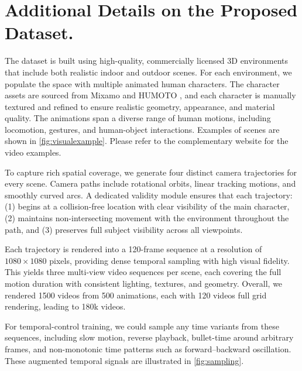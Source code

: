 \section{Additional Details on the Proposed \nameDataset Dataset.}

The \texttt{\nameDataset} dataset is built using high-quality, commercially licensed 3D environments that include both realistic indoor and outdoor scenes. For each environment, we populate the space with multiple animated human characters. 
The character assets are sourced from Mixamo \cite{mixamo} and HUMOTO \cite{Lu_2025_HUMOTO}, and each character is manually textured and refined to ensure realistic geometry, appearance, and material quality. 
The animations span a diverse range of human motions, including locomotion, gestures, and human-object interactions.
Examples of scenes are shown in \cref{fig:visualexample}. 
Please refer to the complementary website for the video examples.

To capture rich spatial coverage, we generate four distinct camera trajectories for every scene. Camera paths include rotational orbits, linear tracking motions, and smoothly curved arcs. A dedicated validity module ensures that each trajectory:
(1) begins at a collision-free location with clear visibility of the main character,
(2) maintains non-intersecting movement with the environment throughout the path, and
(3) preserves full subject visibility across all viewpoints.

Each trajectory is rendered into a 120-frame sequence at a resolution of $1080 \times 1080$ pixels, providing dense temporal sampling with high visual fidelity. This yields three multi-view video sequences per scene, each covering the full motion duration with consistent lighting, textures, and geometry. Overall, we rendered 1500 videos from 500 animations, each with 120 videos full grid rendering, leading to 180k videos.

For temporal-control training, we could sample any time variants from these sequences, including slow motion, reverse playback, bullet-time around arbitrary frames, and non-monotonic time patterns such as forward–backward oscillation. These augmented temporal signals are illustrated in \cref{fig:sampling}.





